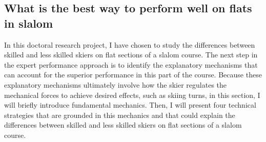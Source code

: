 \documentclass{report}
\begin{document}
\subsection{What is the best way to perform well on flats in slalom}
In this doctoral research project, I have chosen to study the differences between skilled and less skilled skiers on flat sections of a slalom course. The next step in the expert performance approach is to identify the explanatory mechanisms that can account for the superior performance in this part of the course. Because these explanatory mechanisms ultimately involve how the skier regulates the mechanical forces to achieve desired effects, such as skiing turns, in this section, I will briefly introduce fundamental mechanics. Then, I will present four technical strategies that are grounded in this mechanics and that could explain the differences between skilled and less skilled skiers on flat sections of a slalom course.
\end{document}
